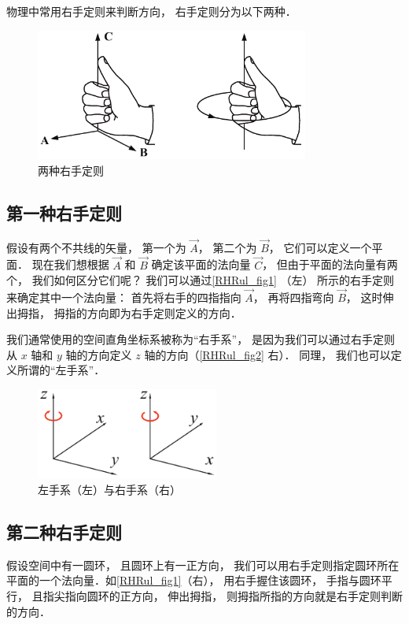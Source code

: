 
物理中常用右手定则来判断方向， 右手定则分为以下两种．

\begin{figure}[ht]
\centering
\includegraphics[width=9cm]{./figures/RHRul1.pdf}
\caption{两种右手定则} \label{RHRul_fig1}
\end{figure}

\subsection{第一种右手定则}
假设有两个不共线的矢量， 第一个为 $\vec A$， 第二个为 $\vec B$， 它们可以定义一个平面． 现在我们想根据 $\vec A$ 和 $\vec B$ 确定该平面的法向量 $\vec C$， 但由于平面的法向量有两个， 我们如何区分它们呢？ 我们可以通过\autoref{RHRul_fig1} （左） 所示的右手定则来确定其中一个法向量： 首先将右手的四指指向 $\vec A$， 再将四指弯向 $\vec B$， 这时伸出拇指， 拇指的方向即为右手定则定义的方向．

我们通常使用的空间直角坐标系被称为“右手系”， 是因为我们可以通过右手定则从 $x$ 轴和 $y$ 轴的方向定义 $z$ 轴的方向（\autoref{RHRul_fig2} 右）． 同理， 我们也可以定义所谓的“左手系”．

\begin{figure}[ht]
\centering
\includegraphics[width=6cm]{./figures/RHRul2.pdf}
\caption{左手系（左）与右手系（右）} \label{RHRul_fig2}
\end{figure}

\subsection{第二种右手定则}
假设空间中有一圆环， 且圆环上有一正方向， 我们可以用右手定则指定圆环所在平面的一个法向量．如\autoref{RHRul_fig1}（右）， 用右手握住该圆环， 手指与圆环平行， 且指尖指向圆环的正方向， 伸出拇指， 则拇指所指的方向就是右手定则判断的方向．
